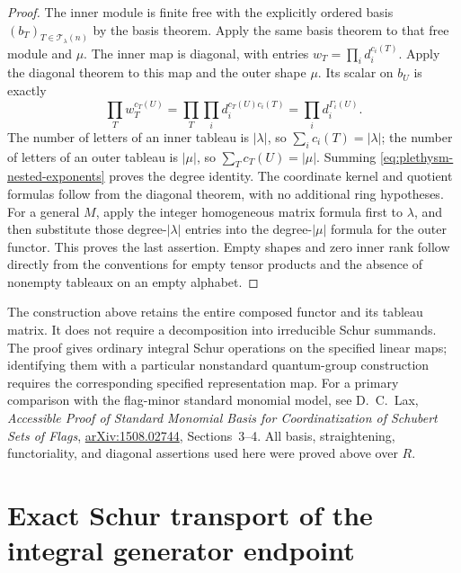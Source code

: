 \begin{proof}
The inner module is finite free with the explicitly ordered basis
$(b_T)_{T\in\mathcal T_\lambda(n)}$ by the basis theorem.
Apply the same basis theorem to that free module and $\mu$.
The inner map is diagonal, with entries
$w_T=\prod_i d_i^{c_i(T)}$. Apply the diagonal theorem to this
map and the outer shape $\mu$. Its scalar on $b_U$ is exactly
\[
 \prod_T w_T^{c_T(U)}
   =\prod_T\prod_i d_i^{c_T(U)c_i(T)}
   =\prod_i d_i^{\Gamma_i(U)}.
\]
The number of letters of an inner tableau is $|\lambda|$, so
$\sum_i c_i(T)=|\lambda|$; the number of letters of an outer
tableau is $|\mu|$, so $\sum_T c_T(U)=|\mu|$. Summing
\eqref{eq:plethysm-nested-exponents} proves the degree identity.
The coordinate kernel and quotient formulas follow from the
diagonal theorem, with no additional ring hypotheses.
For a general $M$, apply the integer homogeneous matrix formula
first to $\lambda$, and then substitute those degree-$|\lambda|$
entries into the degree-$|\mu|$ formula for the outer functor.
This proves the last assertion. Empty shapes and zero inner
rank follow directly from the conventions for empty tensor
products and the absence of nonempty tableaux on an empty
alphabet.
\end{proof}

The construction above retains the entire composed functor and
its tableau matrix. It does not require a decomposition into
irreducible Schur summands. The proof gives ordinary integral
Schur operations on the specified linear maps; identifying them
with a particular nonstandard quantum-group construction requires
the corresponding specified representation map.
For a primary comparison with the flag-minor standard monomial
model, see D.~C.~Lax, \emph{Accessible Proof of Standard Monomial
Basis for Coordinatization of Schubert Sets of Flags},
\href{https://arxiv.org/abs/1508.02744}{arXiv:1508.02744},
Sections~3--4. All basis, straightening, functoriality, and
diagonal assertions used here were proved above over $R$.

\section{Exact Schur transport of the integral generator endpoint}
\label{sec:plethysm-endpoint-transport}

